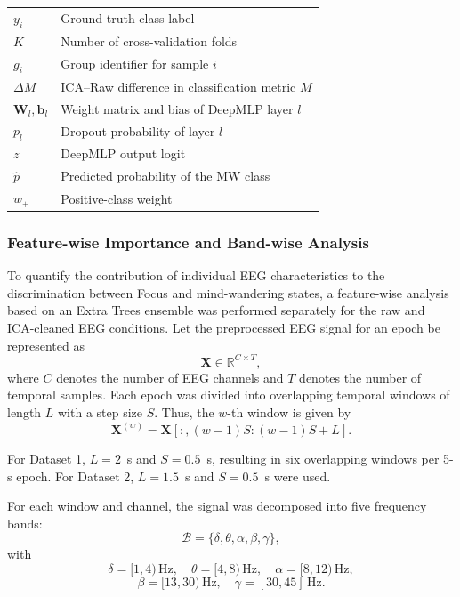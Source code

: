 \documentclass[conference]{IEEEtran}
\begin{document}
\begin{table}[htbp]
\begin{tabular}{ll}
$y_i$ & Ground-truth class label \\
$K$ & Number of cross-validation folds \\
$g_i$ & Group identifier for sample $i$ \\
$\Delta M$ & ICA--Raw difference in classification metric $M$ \\
$\mathbf{W}_l,\mathbf{b}_l$ & Weight matrix and bias of DeepMLP layer $l$ \\
$p_l$ & Dropout probability of layer $l$ \\
$z$ & DeepMLP output logit \\
$\hat{p}$ & Predicted probability of the MW class \\
$w_+$ & Positive-class weight \\
\hline
\end{tabular}
\end{table}

\subsubsection{Feature-wise Importance and Band-wise Analysis}

To quantify the contribution of individual EEG characteristics to the discrimination between Focus and mind-wandering states, a feature-wise analysis based on an Extra Trees ensemble was performed separately for the raw and ICA-cleaned EEG conditions. Let the preprocessed EEG signal for an epoch be represented as
\begin{equation}
\mathbf{X} \in \mathbb{R}^{C \times T},
\end{equation}
where $C$ denotes the number of EEG channels and $T$ denotes the number of temporal samples. Each epoch was divided into overlapping temporal windows of length $L$ with a step size $S$. Thus, the $w$-th window is given by
\begin{equation}
\mathbf{X}^{(w)}
=
\mathbf{X}[:,(w-1)S:(w-1)S+L].
\end{equation}

For Dataset 1, $L=2$~s and $S=0.5$~s, resulting in six overlapping windows per 5-s epoch. For Dataset 2, $L=1.5$~s and $S=0.5$~s were used.

For each window and channel, the signal was decomposed into five frequency bands:
\begin{equation}
\mathcal{B}=
\{\delta,\theta,\alpha,\beta,\gamma\},
\end{equation}
with
\begin{equation}
\delta=[1,4)\,\mathrm{Hz},\quad
\theta=[4,8)\,\mathrm{Hz},\quad
\alpha=[8,12)\,\mathrm{Hz},
\end{equation}
\begin{equation}
\beta=[13,30)\,\mathrm{Hz},\quad
\gamma=[30,45]\,\mathrm{Hz}.
\end{equation}
\end{document}
